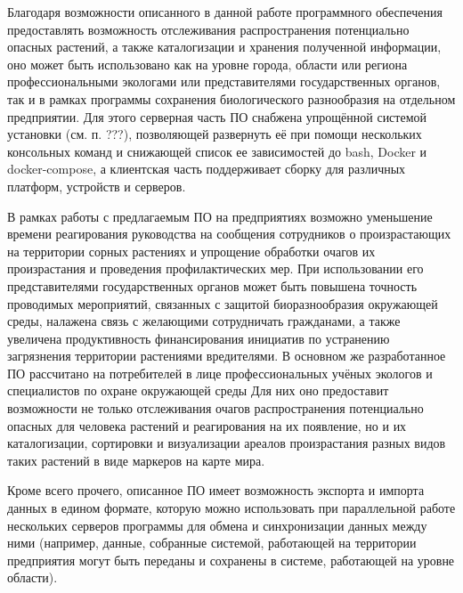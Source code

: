 \nwln
Благодаря возможности описанного в данной работе программного обеспечения предоставлять возможность отслеживания распространения потенциально опасных растений, а также каталогизации и хранения полученной информации, оно может быть использовано как на уровне города, области или региона профессиональными экологами или представителями государственных органов, так и в рамках программы сохранения биологического разнообразия на отдельном предприятии.
Для этого серверная часть ПО снабжена упрощённой системой установки (см. п. ???), позволяющей развернуть её при помощи нескольких консольных команд и снижающей список ее зависимостей до bash, Docker и docker-compose, а клиентская часть поддерживает сборку для различных платформ, устройств и серверов.

\nwln
В рамках работы с предлагаемым ПО на предприятиях возможно уменьшение времени реагирования руководства на сообщения сотрудников о произрастающих на территории сорных растениях и упрощение обработки очагов их произрастания и проведения профилактических мер.
При использовании его представителями государственных органов может быть повышена точность проводимых мероприятий, связанных с защитой биоразнообразия окружающей среды, налажена связь с желающими сотрудничать гражданами, а также увеличена продуктивность финансирования инициатив по устранению загрязнения территории растениями вредителями.
В основном же разработанное ПО рассчитано на потребителей в лице профессиональных учёных экологов и специалистов по охране окружающей среды
Для них оно предоставит возможности не только отслеживания очагов распространения потенциально опасных для человека растений и реагирования на их появление, но и их каталогизации, сортировки и визуализации ареалов произрастания разных видов таких растений в виде маркеров на карте мира.

\nwln
Кроме всего прочего, описанное ПО имеет возможность экспорта и импорта данных в едином формате, которую можно использовать при параллельной работе нескольких серверов программы для обмена и синхронизации данных между ними (например, данные, собранные системой, работающей на территории предприятия могут быть переданы и сохранены в системе, работающей на уровне области).
